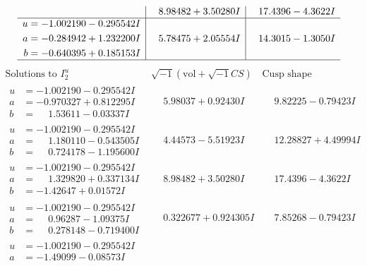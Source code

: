 \documentclass[1p]{elsarticle_modified}
\theoremstyle{definition}
\newcommand{\I}{\sqrt{-1}}
\begin{document}
$$\begin{array}{c|c|c}
 & \phantom{-}8.98482 + 3.50280 I & \phantom{-}17.4396 - 4.3622 I \\ \hline\begin{aligned}
u &= -1.002190 - 0.295542 I \\
a &= -0.284942 + 1.232200 I \\
b &= -0.640395 + 0.185153 I\end{aligned}
 & \phantom{-}5.78475 + 2.05554 I & \phantom{-}14.3015 - 1.3050 I\\
 \hline 
 \end{array}$$\newpage$$\begin{array}{c|c|c}  
\text{Solutions to }I^u_{2}& \I (\text{vol} + \sqrt{-1}CS) & \text{Cusp shape}\\
 \hline 
\begin{aligned}
u &= -1.002190 - 0.295542 I \\
a &= -0.970327 + 0.812295 I \\
b &= \phantom{-}1.53611 - 0.03337 I\end{aligned}
 & \phantom{-}5.98037 + 0.92430 I & \phantom{-}9.82225 - 0.79423 I \\ \hline\begin{aligned}
u &= -1.002190 - 0.295542 I \\
a &= \phantom{-}1.180110 - 0.543505 I \\
b &= \phantom{-}0.724178 - 1.195600 I\end{aligned}
 & \phantom{-}4.44573 - 5.51923 I & \phantom{-}12.28827 + 4.49994 I \\ \hline\begin{aligned}
u &= -1.002190 - 0.295542 I \\
a &= \phantom{-}1.329820 + 0.337134 I \\
b &= -1.42647 + 0.01572 I\end{aligned}
 & \phantom{-}8.98482 + 3.50280 I & \phantom{-}17.4396 - 4.3622 I \\ \hline\begin{aligned}
u &= -1.002190 - 0.295542 I \\
a &= \phantom{-}0.96287 - 1.09375 I \\
b &= \phantom{-}0.278148 - 0.719400 I\end{aligned}
 & \phantom{-}0.322677 + 0.924305 I & \phantom{-}7.85268 - 0.79423 I \\ \hline\begin{aligned}
u &= -1.002190 - 0.295542 I \\
a &= -1.49099 - 0.08573 I \\

\end{aligned}
\end{array}$$
\end{document}
